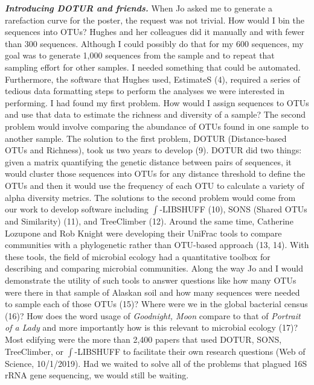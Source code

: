 \documentclass[11pt,]{article}
\begin{document}
\textbf{\emph{Introducing DOTUR and friends.}} When Jo asked me to
generate a rarefaction curve for the poster, the request was not
trivial. How would I bin the sequences into OTUs? Hughes and her
colleagues did it manually and with fewer than 300 sequences. Although I
could possibly do that for my 600 sequences, my goal was to generate
1,000 sequences from the sample and to repeat that sampling effort for
other samples. I needed something that could be automated. Furthermore,
the software that Hughes used, EstimateS (4), required a series of
tedious data formatting steps to perform the analyses we were interested
in performing. I had found my first problem. How would I assign
sequences to OTUs and use that data to estimate the richness and
diversity of a sample? The second problem would involve comparing the
abundance of OTUs found in one sample to another sample. The solution to
the first problem, DOTUR (Distance-based OTUs and Richness), took us two
years to develop (9). DOTUR did two things: given a matrix quantifying
the genetic distance between pairs of sequences, it would cluster those
sequences into OTUs for any distance threshold to define the OTUs and
then it would use the frequency of each OTU to calculate a variety of
alpha diversity metrics. The solutions to the second problem would come
from our work to develop software including \(\int\)-LIBSHUFF (10), SONS
(Shared OTUs and Similarity) (11), and TreeClimber (12). Around the same
time, Catherine Lozupone and Rob Knight were developing their UniFrac
tools to compare communities with a phylogenetic rather than OTU-based
approach (13, 14). With these tools, the field of microbial ecology had
a quantitative toolbox for describing and comparing microbial
communities. Along the way Jo and I would demonstrate the utility of
such tools to answer questions like how many OTUs were there in that
sample of Alaskan soil and how many sequences were needed to sample each
of those OTUs (15)? Where were we in the global bacterial census (16)?
How does the word usage of \emph{Goodnight, Moon} compare to that of
\emph{Portrait of a Lady} and more importantly how is this relevant to
microbial ecology (17)? Most edifying were the more than 2,400 papers
that used DOTUR, SONS, TreeClimber, or \(\int\)-LIBSHUFF to facilitate
their own research questions (Web of Science, 10/1/2019). Had we waited
to solve all of the problems that plagued 16S rRNA gene sequencing, we
would still be waiting.
\end{document}
